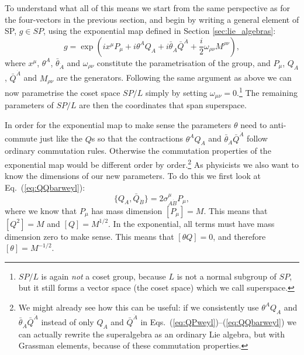 \documentclass[notes.tex]{subfiles}
\begin{document}
To understand what all of this means we start from the same perspective as for the four-vectors in the previous section, and begin by writing a general element of SP, $g\in SP$, using the exponential map defined in Section \ref{sec:lie_algebras}:
\[g = \exp\left(ix^\mu P_\mu + i\theta^{A} Q_A + i\bar{\theta}_{\dot{A}}\bar{Q}^{\dot{A}} + \frac{i}{2}\omega_{\rho\nu}M^{\rho\nu}\right),\]
where $x^\mu$, $\theta^{A}$, $\bar{\theta}_{\dot{A}}$ and $\omega_{\rho\nu}$ constitute the parametrisation of the group, and $P_\mu$, $Q_A$, $\bar Q^{\dot{A}}$ and $M_{\rho\nu}$ are the generators. Following the same argument as above we can now parametrise the coset space $SP/L$ simply by setting $\omega_{\mu\nu} = 0$.\footnote{$SP/L$ is again {\it not} a coset group, because $L$ is not a normal subgroup of $SP$, but it still forms a vector space (the coset space) which we call superspace.} The remaining parameters of $SP/L$ are then the coordinates that span superspace. 

In order for the exponential map to make sense the parameters $\theta$ need to anti-commute just like the $Q$s so that the contractions $\theta^{A} Q_A$ and $\bar{\theta}_{\dot{A}}\bar{Q}^{\dot{A}}$ follow ordinary commutation rules. Otherwise the commutation properties of the exponential map would be different order by order.\footnote{We might already see how this can be useful: if we consistently use $\theta^AQ_A$ and $\bar{\theta}_{\dot{A}}\bar{Q}^{\dot{A}}$ instead of only $Q_A$ and $\bar{Q}^{\dot{A}}$ in Eqs.~(\ref{eq:QPweyl})--(\ref{eq:QQbarweyl}) we can actually rewrite the superalgebra as an ordinary Lie algebra, but with Grassman elements, because of these commutation properties.}
 As physicists we also want to know the dimensions of our new parameters. To do this we first look at Eq.~(\ref{eq:QQbarweyl}):
\[\{Q_A, \bar{Q}_{\dot{B}}\} = 2\sigma^{\mu}_{A\dot{B}}P_\mu,\]
where we know that $P_\mu$ has mass dimension $[P_\mu] = M$. This means that $[Q^2] = M$ and $[Q]=M^{1/2}$. In the exponential, all terms must have mass dimension zero to make sense. This means that $[\theta Q] = 0$, and therefore $[\theta] = M^{-1/2}$.
\end{document}
